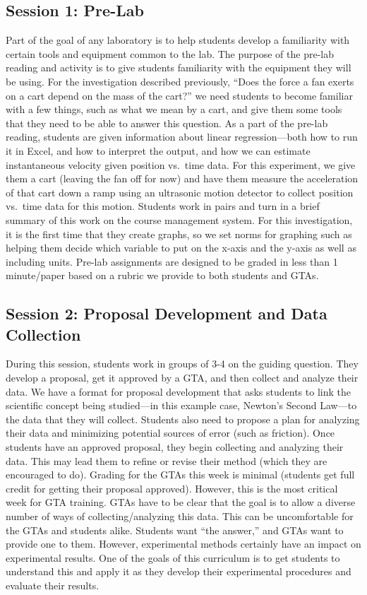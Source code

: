 \documentclass[aip, numerical, preprint]{revtex4-2}
\begin{document}
\subsection{Session 1: Pre-Lab}
Part of the goal of any laboratory is to help students develop a familiarity with certain tools
and equipment common to the lab.  The purpose of the pre-lab reading and activity is to give
students familiarity with the equipment they will be using.  For the investigation described
previously, ``Does the force a fan exerts on a cart depend on the mass of the cart?''  we need
students to become familiar with a few things, such as what we mean by a cart, and give them
some tools that they need to be able to answer this question.  As a part of the pre-lab
reading, students are given information about linear regression---both how to run it in Excel,
and how to interpret the output, and how we can estimate instantaneous velocity given position
vs.\ time data. For this experiment, we give them a cart (leaving the fan off for now) and have
them measure the acceleration of that cart down a ramp using an ultrasonic motion detector to
collect position vs.\ time data for this motion.  Students work in pairs and turn in a brief
summary of this work on the course management system.  For this investigation, it is the first
time that they create graphs, so we set norms for graphing such as helping them decide which
variable to put on the x-axis and the y-axis as well as including units.  Pre-lab assignments
are designed to be graded in less than 1 minute/paper based on a rubric we provide to both
students and GTAs.

\subsection{Session 2: Proposal Development and Data Collection}
During this session, students work in groups of 3-4 on the guiding question.  They develop a
proposal, get it approved by a GTA, and then collect and analyze their data.  We have a format
for proposal development that asks students to link the scientific concept being studied---in
this example case, Newton's Second Law---to the data that they will collect.  Students also
need to propose a plan for analyzing their data and minimizing potential sources of error (such
as friction).  Once students have an approved proposal, they begin collecting and analyzing
their data.  This may lead them to refine or revise their method (which they are encouraged to
do).  Grading for the GTAs this week is minimal (students get full credit for getting their
proposal approved).  However, this is the most critical week for GTA training.  GTAs have to be
clear that the goal is to allow a diverse number of ways of collecting/analyzing this
data. This can be uncomfortable for the GTAs and students alike.  Students want ``the answer,''
and GTAs want to provide one to them.  However, experimental methods certainly have an impact
on experimental results. One of the goals of this curriculum is to get students to understand
this and apply it as they develop their experimental procedures and evaluate their results.
\end{document}
